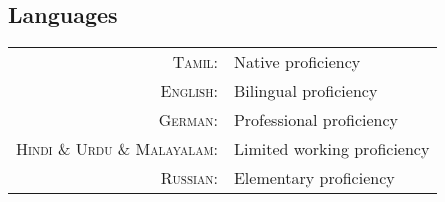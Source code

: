 \subsection{Languages}
\begin{longtable}
	{rl} \textsc{Tamil:}&Native proficiency\\
	\textsc{English:}&Bilingual proficiency\\
	\textsc{German:}&Professional proficiency\\
	\textsc{Hindi \& Urdu \& Malayalam:}&Limited working proficiency\\
	\textsc{Russian:}&Elementary proficiency\\
\end{longtable}
